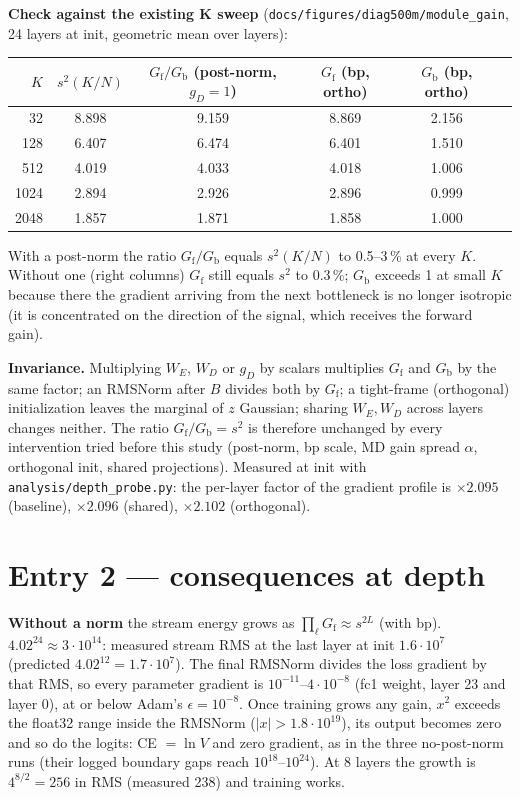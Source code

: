 \documentclass[11pt,a4paper]{article}
\newcommand{\code}[1]{\texttt{#1}}
\newcommand{\Gf}{G_{\mathrm{f}}}
\newcommand{\Gb}{G_{\mathrm{b}}}
\begin{document}
\textbf{Check against the existing K sweep} (\code{docs/figures/diag500m/module\_gain},
24 layers at init, geometric mean over layers):

\begin{center}\small
\begin{tabular}{rccccc}
\toprule
\(K\) & \(s^2(K/N)\) & \(\Gf/\Gb\) (post-norm, \(g_D=1\)) & \(\Gf\) (bp, ortho) & \(\Gb\) (bp, ortho) \\
\midrule
32   & 8.898 & 9.159 & 8.869 & 2.156 \\
128  & 6.407 & 6.474 & 6.401 & 1.510 \\
512  & 4.019 & 4.033 & 4.018 & 1.006 \\
1024 & 2.894 & 2.926 & 2.896 & 0.999 \\
2048 & 1.857 & 1.871 & 1.858 & 1.000 \\
\bottomrule
\end{tabular}
\end{center}

With a post-norm the ratio \(\Gf/\Gb\) equals \(s^2(K/N)\) to 0.5--3\,\% at
every \(K\).  Without one (right columns) \(\Gf\) still equals \(s^2\) to
0.3\,\%; \(\Gb\) exceeds 1 at small \(K\) because there the gradient arriving
from the next bottleneck is no longer isotropic (it is concentrated on the
direction of the signal, which receives the forward gain).

\textbf{Invariance.}  Multiplying \(W_E\), \(W_D\) or \(g_D\) by scalars
multiplies \(\Gf\) and \(\Gb\) by the same factor; an RMSNorm after \(B\) divides
both by \(\Gf\); a tight-frame (orthogonal) initialization leaves the marginal of
\(z\) Gaussian; sharing \(W_E,W_D\) across layers changes neither.  The ratio
\(\Gf/\Gb=s^2\) is therefore unchanged by every intervention tried before this
study (post-norm, bp scale, MD gain spread \(\alpha\), orthogonal init, shared
projections).  Measured at init with \code{analysis/depth\_probe.py}: the
per-layer factor of the gradient profile is \(\times2.095\) (baseline),
\(\times2.096\) (shared), \(\times2.102\) (orthogonal).

\section{Entry 2 --- consequences at depth}

\textbf{Without a norm} the stream energy grows as \(\prod_\ell \Gf \approx s^{2L}\)
(with bp).  \(4.02^{24}\approx 3\cdot10^{14}\): measured stream RMS at the last
layer at init \(1.6\cdot10^{7}\) (predicted \(4.02^{12}=1.7\cdot10^7\)).  The final
RMSNorm divides the loss gradient by that RMS, so every parameter gradient is
\(10^{-11}\)--\(4\cdot10^{-8}\) (fc1 weight, layer 23 and layer 0), at or below
Adam's \(\epsilon=10^{-8}\).  Once training grows any gain, \(x^2\) exceeds the
float32 range inside the RMSNorm (\(|x|>1.8\cdot10^{19}\)), its output becomes
zero and so do the logits: CE \(=\ln V\) and zero gradient, as in the three
no-post-norm runs (their logged boundary gaps reach \(10^{18}\)--\(10^{24}\)).
At 8 layers the growth is \(4^{8/2}=256\) in RMS (measured 238) and training works.
\end{document}
